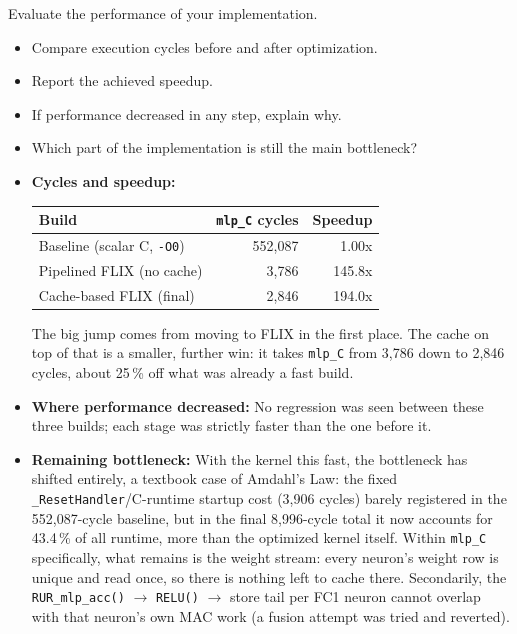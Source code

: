 \documentclass[11pt,a4paper]{report}
\newcommand{\answer}[1]{\vspace{-1.5em}\begin{oframed}#1\end{oframed}}
\begin{document}
Evaluate the performance of your implementation.
\begin{itemize}
    \item Compare execution cycles before and after optimization.
    \item Report the achieved speedup.
    \item If performance decreased in any step, explain why.
    \item Which part of the implementation is still the main bottleneck?
\end{itemize}
\answer{
\begin{itemize}
    \item \textbf{Cycles and speedup:}
        \begin{center}
        \begin{tabular}{@{}lrr@{}}
        \hline
        \textbf{Build} & \textbf{\texttt{mlp\_C} cycles} & \textbf{Speedup} \\
        \hline
        Baseline (scalar C, \texttt{-O0}) & 552{,}087 & 1.00x \\
        Pipelined FLIX (no cache) & 3{,}786 & 145.8x \\
        Cache-based FLIX (final) & 2{,}846 & 194.0x \\
        \hline
        \end{tabular}
        \end{center}
        The big jump comes from moving to FLIX in the first place. The
        cache on top of that is a smaller, further win: it takes
        \texttt{mlp\_C} from 3{,}786 down to 2{,}846 cycles, about
        25\,\% off what was already a fast build.
    \item \textbf{Where performance decreased:} No regression was
        seen between these three builds; each stage was strictly
        faster than the one before it.
    \item \textbf{Remaining bottleneck:} With the kernel this fast,
        the bottleneck has shifted entirely, a textbook case of
        Amdahl's Law: the fixed \texttt{\_ResetHandler}/C-runtime
        startup cost (3{,}906 cycles) barely registered in the
        552,087-cycle baseline, but in the final 8{,}996-cycle total
        it now accounts for 43.4\,\% of all runtime, more than the
        optimized kernel itself. Within \texttt{mlp\_C} specifically,
        what remains is the weight stream: every neuron's weight row
        is unique and read once, so there is nothing left to cache
        there. Secondarily, the \texttt{RUR\_mlp\_acc()} $\to$
        \texttt{RELU()} $\to$ store tail per FC1 neuron cannot overlap
        with that neuron's own MAC work (a fusion attempt was tried
        and reverted).
\end{itemize}
}
\end{document}
